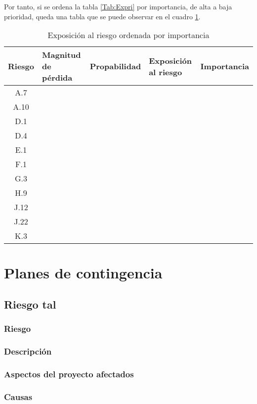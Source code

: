 \documentclass[11pt,a4paper,spanish,twoside]{report}
\begin{document}
Por tanto, si se ordena la tabla \ref{Tab:Expri} por importancia, de alta a
baja prioridad, queda una tabla que se puede observar en el cuadro
\ref{Tab:Expor}.


\begin{table}[!h]
  \centering
  \begin{tabular}{|c||p{}||c||p{}||c|}
    \hline
    \textbf{Riesgo} & \textbf{Magnitud de pérdida} & \textbf{Propabilidad} & 
    \textbf{Exposición al riesgo} & \textbf{Importancia} \\
    \hline \hline
    A.7 &  &  &  &  \\ 
    \hline
    A.10 &  &  &  &  \\
    \hline 
    D.1 &  &  &  &  \\
    \hline
    D.4 &  &  &  &  \\
    \hline
    E.1 &  &  &  &  \\
    \hline
    F.1 &  &  &  &  \\
    \hline
    G.3 &  &  &  &  \\
    \hline
    H.9 &  &  &  &  \\
    \hline
    J.12 &  &  &  &  \\
    \hline
    J.22 &  &  &  &  \\
    \hline
    K.3 &  &  &  &  \\
    \hline
  \end{tabular}
  \caption{Exposición al riesgo ordenada por importancia} 
  \label{Tab:Expor}
\end{table}
\chapter{Planes de contingencia}
\section{Riesgo tal}
\subsection{Riesgo}
\subsection{Descripción}
\subsection{Aspectos del proyecto afectados}
\subsection{Causas}
\end{document}
